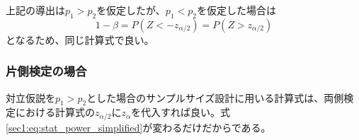 上記の導出は$p_{1} > p_{2}$を仮定したが、$p_{1} < p_{2}$を仮定した場合は
\begin{equation}
    1 - \beta = P(Z < -z_{\alpha/2}) = P(Z > z_{\alpha/2})
\end{equation}
となるため、同じ計算式で良い。

\subsubsection{片側検定の場合}
対立仮説を$p_{1} > p_{2}$とした場合のサンプルサイズ設計に用いる計算式は、両側検定における計算式の$z_{\alpha/2}$に$z_{\alpha}$を代入すれば良い。式\eqref{sec1:eq:stat_power_simplified}が変わるだけだからである。


